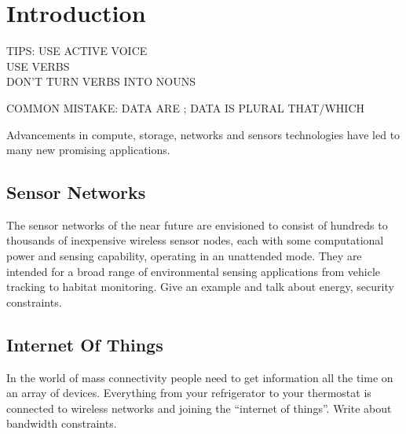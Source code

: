 %
%
%


\chapter{Introduction}

	TIPS:
		USE ACTIVE VOICE\\
		USE VERBS\\
		DON'T TURN VERBS INTO NOUNS

	COMMON MISTAKE:
		DATA ARE ; DATA IS PLURAL
		THAT/WHICH

	Advancements in compute, storage, networks and sensors technologies have led to many new promising applications. 

	\section{Sensor Networks}

		The sensor networks of the near future are envisioned
		to consist of hundreds to thousands of inexpensive
		wireless sensor nodes, each with some computational power
		and sensing capability, operating in an unattended mode.
		They are intended for a broad range of environmental sensing
		applications from vehicle tracking to habitat monitoring.
		Give an example and talk about energy, security constraints.

	\section{Internet Of Things}

		In the world of mass connectivity people need to get information all the time on an array of devices. Everything from your refrigerator to your thermostat is connected to wireless networks and joining the ``internet of things''. Write about bandwidth constraints.

